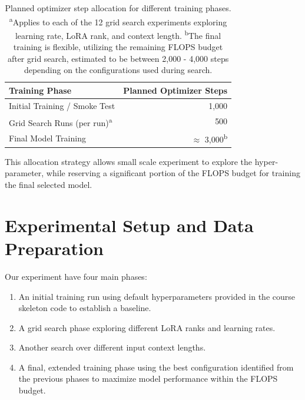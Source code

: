 \documentclass{article}
\begin{document}
\begin{table}[!htbp] %
\renewcommand{\arraystretch}{1.4}
\centering
\setlength{\tabcolsep}{8pt} 
\begin{tabular}{lr}
    \toprule
    \textbf{Training Phase}           & \textbf{Planned Optimizer Steps} \\ %
    \midrule
    Initial Training / Smoke Test      & 1,000 \\
    Grid Search Runs (per run)\textsuperscript{a}  & 500 \\
    Final Model Training            & $\approx$ 3,000\textsuperscript{b} \\ %
    \bottomrule
\end{tabular}
\caption{Planned optimizer step allocation for different training phases. \newline 
\textsuperscript{a}Applies to each of the 12 grid search experiments exploring learning rate, LoRA rank, and context length. \newline 
\textsuperscript{b}The final training is flexible, utilizing the remaining FLOPS budget after grid search, estimated to be between 2,000 - 4,000 steps depending on the configurations used during search.}
\label{tab:training_steps}
\end{table}

This allocation strategy allows small scale experiment to explore the hyper-parameter, while reserving a significant portion of the FLOPS budget for training the final selected model.



\section{Experimental Setup and Data Preparation}

Our experiment have four main phases: 
\begin{enumerate}
    \item An initial training run using default hyperparameters provided in the course skeleton code to establish a baseline.
    \item A grid search phase exploring different LoRA ranks and learning rates.
    \item Another search over different input context lengths.
    \item A final, extended training phase using the best configuration identified from the previous phases to maximize model performance within the FLOPS budget.
\end{enumerate}
\end{document}
